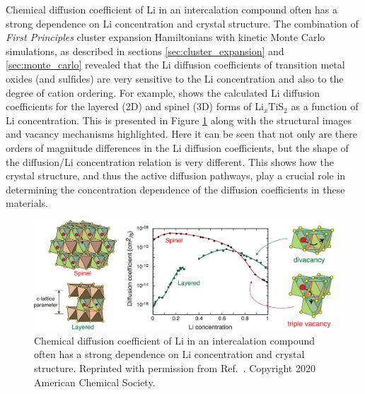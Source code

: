 \documentclass[../main.tex]{subfiles}
\begin{document}
Chemical diffusion coefficient of Li in an intercalation compound often has a strong dependence on Li concentration and crystal structure. The combination of \textit{First Principles} cluster expansion Hamiltonians with kinetic Monte Carlo simulations, as described in sections \ref{sec:cluster_expansion} and \ref{sec:monte_carlo} revealed that the Li diffusion coefficients of transition metal oxides (and sulfides) are very sensitive to the Li concentration and also to the degree of cation ordering. \cite{van2008nondilute,VanderVen2001, bhattacharya2011first, bhattacharya2010phase, VanDerVen2013} For example, \citeauthor{VanderVen2020} shows the calculated Li diffusion coefficients for the layered (2D) and spinel (3D) forms of Li$_x$TiS$_2$ as a function of Li concentration. \cite{VanderVen2020,VanDerVen2013,van2008nondilute,bhattacharya2011first} This is presented in Figure \ref{fig:LixTiS2_diffusion} along with the structural images and vacancy mechanisms highlighted. Here it can be seen that not only are there orders of magnitude differences in the Li diffusion coefficients, but the shape of the diffusion/Li concentration relation is very different. This shows how the crystal structure, and thus the active diffusion pathways, play a crucial role in determining the concentration dependence of the diffusion coefficients in these materials.

\begin{figure}
    \centering
    \includegraphics[scale=0.26]{figures/LixTiS2_diffusion.jpeg}
    \caption{ Chemical diffusion coefficient of Li in an intercalation compound often has a strong dependence on Li concentration and crystal structure. Reprinted with permission from Ref.~. Copyright 2020 American Chemical Society.}
    \label{fig:LixTiS2_diffusion}
\end{figure}
\end{document}
